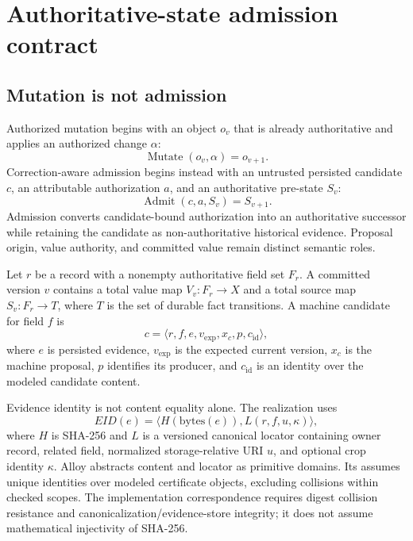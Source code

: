 \section{Authoritative-state admission contract}
\label{sec:contract}

\subsection{Mutation is not admission}

Authorized mutation begins with an object $o_v$ that is already authoritative and applies an authorized change $\alpha$:
\begin{equation}
\operatorname{Mutate}(o_v,\alpha)=o_{v+1}.
\end{equation}
Correction-aware admission begins instead with an untrusted persisted candidate $c$, an attributable authorization $a$, and an authoritative pre-state $S_v$:
\begin{equation}
\operatorname{Admit}(c,a,S_v)=S_{v+1}.
\label{eq:admit}
\end{equation}
Admission converts candidate-bound authorization into an authoritative successor while retaining the candidate as non-authoritative historical evidence. Proposal origin, value authority, and committed value remain distinct semantic roles.

Let $r$ be a record with a nonempty authoritative field set $F_r$. A committed version $v$ contains a total value map $V_v:F_r\rightarrow X$ and a total source map $S_v:F_r\rightarrow T$, where $T$ is the set of durable fact transitions. A machine candidate for field $f$ is
\begin{equation}
c=\langle r,f,e,v_{\mathrm{exp}},x_c,p,c_{\mathrm{id}}\rangle,
\label{eq:candidate}
\end{equation}
where $e$ is persisted evidence, $v_{\mathrm{exp}}$ is the expected current version, $x_c$ is the machine proposal, $p$ identifies its producer, and $c_{\mathrm{id}}$ is an identity over the modeled candidate content.

Evidence identity is not content equality alone. The realization uses
\begin{equation}
EID(e)=\langle H(\mathrm{bytes}(e)),L(r,f,u,\kappa)\rangle,
\label{eq:evidence}
\end{equation}
where $H$ is SHA-256 and $L$ is a versioned canonical locator containing owner record, related field, normalized storage-relative URI $u$, and optional crop identity $\kappa$. Alloy abstracts content and locator as primitive domains. Its  assumes unique identities over modeled certificate objects, excluding collisions within checked scopes. The implementation correspondence requires digest collision resistance and canonicalization/evidence-store integrity; it does not assume mathematical injectivity of SHA-256.

